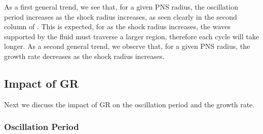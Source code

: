 As a first general trend, we see that, for a given PNS radius,
the oscillation period increases as the shock radius increases,
as seen clearly in the second column of .
This is expected, for as the shock radius increases,
the waves supported by the fluid must traverse a larger region,
therefore each cycle will take longer.
As a second general trend, we observe that,
for a given PNS radius, the growth rate decreases as the shock radius
increases.

\subsection{Impact of GR}

Next we discuss the impact of GR on the oscillation period and the growth rate.

\subsubsection{Oscillation Period}

